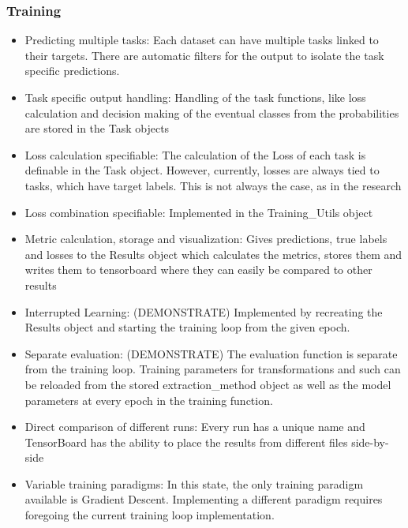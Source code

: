 \subsubsection{Training}
\begin{itemize}
	\item Predicting multiple tasks: Each dataset can have multiple tasks linked to their targets. There are automatic filters for the output to isolate the task specific predictions. 
	\item Task specific output handling: Handling of the task functions, like loss calculation and decision making of the eventual classes from the probabilities are stored in the Task objects 
	\item Loss calculation specifiable: The calculation of the Loss of each task is definable in the Task object. However, currently, losses are always tied to tasks, which have target labels. This is not always the case, as in the research \citep{tagliasacchi2020multi}
	\item Loss combination specifiable: Implemented in the Training\_Utils object
	\item Metric calculation, storage and visualization: Gives predictions, true labels and losses to the Results object which calculates the metrics, stores them and writes them to tensorboard where they can easily be compared to other results
	\item Interrupted Learning: (DEMONSTRATE) Implemented by recreating the Results object and starting the training loop from the given epoch.
	\item Separate evaluation: (DEMONSTRATE) The evaluation function is separate from the training loop. Training parameters for transformations and such can be reloaded from the stored extraction\_method object as well as the model parameters at every epoch in the training function. 
	\item Direct comparison of different runs: Every run has a unique name and TensorBoard has the ability to place the results from different files side-by-side
	\item Variable training paradigms: In this state, the only training paradigm available is Gradient Descent. Implementing a different paradigm requires foregoing the current training loop implementation.
\end{itemize}